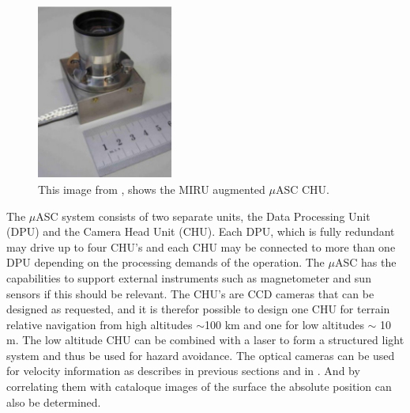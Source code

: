 \begin{figure}[htb]
\begin{center}
\includegraphics[width=0.4\textwidth]{figures/navtheory/chumiro}
\caption{This image from \cite{mirusheet}, shows the MIRU augmented $\mu$ASC CHU.}
\label{miruasc}
\end{center}
\end{figure}

The $\mu$ASC system consists of two separate units, the Data Processing Unit (DPU) and the Camera Head Unit (CHU). Each DPU, which is fully redundant may drive up to four CHU's and each CHU may be connected to more than one DPU depending on the processing demands of the operation. The $\mu$ASC has the capabilities to support external instruments such as magnetometer and sun sensors if this should be relevant. The CHU's are CCD cameras that can be designed as requested, and it is therefor possible to design one CHU for terrain relative navigation from high altitudes $\sim$100 km and one for low altitudes $\sim$ 10 m. The low altitude CHU can be combined with a laser to form a structured light system and thus be used for hazard avoidance. The optical cameras can be used for velocity information as describes in previous sections and in \cite{alessandro}. And by correlating them with cataloque images of the surface the absolute position can also be determined. \\

